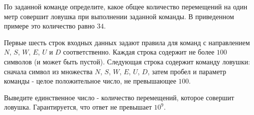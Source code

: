\begin{problem}
По заданной команде определите, какое общее количество перемещений на один метр совершит ловушка при выполнении заданной команды. В приведенном примере это количество равно $34$.

\InputFile

Первые шесть строк входных данных задают правила для команд с направлением $N$, $S$, $W$, $E$, $U$ и $D$ соответственно. Каждая строка содержит не более $100$ символов (и может быть пустой). Следующая строка содержит команду ловушки: сначала символ из множества {$N$, $S$, $W$, $E$, $U$, $D$}, затем пробел и параметр команды - целое положительное число, не превышающее $100$.

\OutputFile

Выведите единственное число - количество перемещений, которое совершит ловушка. Гарантируется, что ответ не превышает $10^9$.

\Examples

\begin{example}
%
\end{example}

\end{problem}
